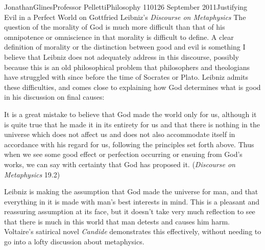 \documentclass[12pt,letterpaper]{article}
\begin{document}
\begin{mla}{Jonathan}{Glines}{Professor Pelletti}{Philosophy 1101}{26 September 2011}{Justifying Evil in a Perfect World on Gottfried Leibniz's \textit{Discourse on Metaphysics}}
The question of the morality of God is much more difficult than that of his omnipotence or omniscience in that morality is difficult to define. A clear definition of morality or the distinction between good and evil is something I believe that Leibniz does not adequately address in this discourse, possibly because this is an old philosophical problem that philosophers and theologians have struggled with since before the time of Socrates or Plato. Leibniz admits these difficulties, and comes close to explaining how God determines what is good in his discussion on final causes:
\begin{mlaquote}
It is a great mistake to believe that God made the world only for us, although it is quite true that he made it in its entirety for us and that there is nothing in the universe which does not affect us and does not also accommodate itself in accordance with his regard for us, following the principles set forth above. Thus when we see some good effect or perfection occurring or ensuing from God's works, we can say with certainty that God has proposed it. (\textit{Discourse on Metaphysics} 19.2)
\end{mlaquote}
Leibniz is making the assumption that God made the universe for man, and that everything in it is made with man's best interests in mind. This is a pleasant and reassuring assumption at its face, but it doesn't take very much reflection to see that there is much in this world that man detests and causes him harm. Voltaire's satirical novel \textit{Candide} demonstrates this effectively, without needing to go into a lofty discussion about metaphysics.


\end{mla}
\end{document}
